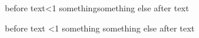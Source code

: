 before text\ifodd\x<1 something\else something else \fi after text

before text
\ifodd
    \x<1 something
    \else
        something else
        \fi
        after text
